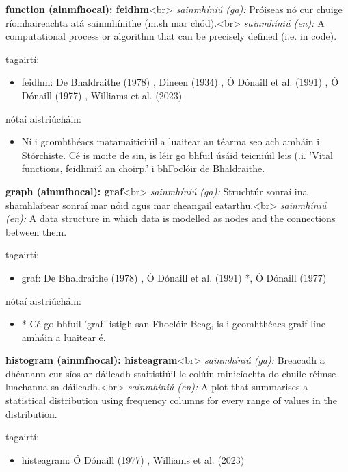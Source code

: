 \documentclass{article}
\begin{document}
\textbf{function (ainmfhocal): feidhm}<br>
\textit{sainmhíniú (ga):} Próiseas nó cur chuige ríomhaireachta atá sainmhínithe (m.sh mar chód).<br>
\textit{sainmhíniú (en):} A computational process or algorithm that can be precisely defined (i.e. in code).

tagairtí:
\begin{itemize}
	\item feidhm: De Bhaldraithe (1978) \cite{de-bhaldraithe}, Dineen (1934) \cite{dineen}, Ó Dónaill et al. (1991) \cite{focloir-beag}, Ó Dónaill (1977) \cite{odonaill}, Williams et al. (2023) \cite{storchiste}
\end{itemize}

nótaí aistriúcháin:
\begin{itemize}
	\item Ní i gcomhthéacs matamaiticiúil a luaitear an téarma seo ach amháin i Stórchiste. Cé is moite de sin, is léir go bhfuil úsáid teicniúil leis (.i. 'Vital functions, feidhmiú an choirp.' i bhFoclóir de Bhaldraithe.
\end{itemize}


\textbf{graph (ainmfhocal): graf}<br>
\textit{sainmhíniú (ga):} Struchtúr sonraí ina shamhlaítear sonraí mar nóid agus mar cheangail eatarthu.<br>
\textit{sainmhíniú (en):} A data structure in which data is modelled as nodes and the connections between them.

tagairtí:
\begin{itemize}
	\item graf: De Bhaldraithe (1978) \cite{de-bhaldraithe}, Ó Dónaill et al. (1991) \cite{focloir-beag}*, Ó Dónaill (1977) \cite{odonaill}
\end{itemize}

nótaí aistriúcháin:
\begin{itemize}
	\item * Cé go bhfuil 'graf' istigh san Fhoclóir Beag, is i gcomhthéacs graif líne amháin a luaitear é.
\end{itemize}


\textbf{histogram (ainmfhocal): histeagram}<br>
\textit{sainmhíniú (ga):} Breacadh a dhéanann cur síos ar dáileadh staitistiúil le colúin minicíochta do chuile réimse luachanna sa dáileadh.<br>
\textit{sainmhíniú (en):} A plot that summarises a statistical distribution using frequency columns for every range of values in the distribution.

tagairtí:
\begin{itemize}
	\item histeagram: Ó Dónaill (1977) \cite{odonaill}, Williams et al. (2023) \cite{storchiste}
\end{itemize}
\end{document}
